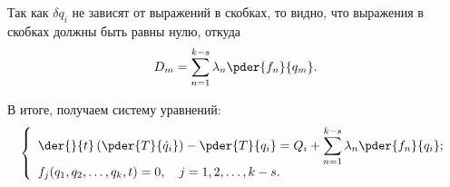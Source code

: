 Так как \( \delta q_i \) не зависят от выражений в скобках, то видно, что
выражения в скобках должны быть равны нулю, откуда
\[
    D_m = \sum_{n=1}^{k-s} \lambda_n \pder{f_n}{q_m}.
\]

В итоге, получаем систему уравнений:
\[
    \left\{ \begin{array}{l}
        \ds \der{}{t}\left(\pder{T}{\dot{q}_i}\right) - \pder{T}{q_i} =
        Q_i + \sum_{n=1}^{k-s} \lambda_n\pder{f_n}{q_i}; \\
        f_j(q_1, q_2, \ldots, q_k, t) = 0, \quad j = 1, 2, \ldots, k - s.
    \end{array} \right.
\]

\newpage
